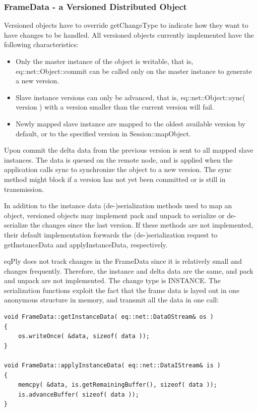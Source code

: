 \documentclass[10pt,a4]{scrartcl}
\begin{document}
\subsubsection{FrameData - a Versioned Distributed Object}

Versioned objects have to override \textsf{getChangeType} to indicate
how they want to have changes to be handled. All versioned objects
currently implemented have the following characteristics:
\begin{itemize}
\item Only the master instance of the object is writable, that is,
  \textsf{eq::net::Object::com\-mit} can be called only on the master
  instance to generate a new version.
\item Slave instance versions can only be advanced, that is,
  \textsf{eq::net::Object::sync( version )} with a version smaller than
  the current version will fail.
\item Newly mapped slave instance are mapped to the oldest available
  version by default, or to the specified version in
  \textsf{Session::mapObject}.
\end{itemize}

Upon \textsf{commit} the delta data from the previous version is sent to
all mapped slave instances. The data is queued on the remote node, and
is applied when the application calls \textsf{sync} to synchronize the
object to a new version. The \textsf{sync} method might block if a
version has not yet been committed or is still in transmission.

In addition to the instance data (de-)serialization methods used to map
an object, versioned objects may implement \textsf{pack} and
\textsf{unpack} to serialize or de-serialize the changes since the last
version. If these methods are not implemented, their default
implementation forwards the (de-)serialization request to
\textsf{getInstanceData} and \textsf{applyInstanceData}, respectively.

\textsf{eqPly} does not track changes in the \textsf{FrameData} since it
is relatively small and changes frequently. Therefore, the instance and
delta data are the same, and \textsf{pack} and \textsf{unpack} are not
implemented. The change type is \textsf{INSTANCE}. The serialization
functions exploit the fact that the frame data is layed out in one
anonymous structure in memory, and transmit all the data in one call:

{\footnotesize\begin{lstlisting}
void FrameData::getInstanceData( eq::net::DataOStream& os )
{ 
    os.writeOnce( &data, sizeof( data )); 
}

void FrameData::applyInstanceData( eq::net::DataIStream& is )
{
    memcpy( &data, is.getRemainingBuffer(), sizeof( data ));
    is.advanceBuffer( sizeof( data ));
}
\end{lstlisting}}%
\end{document}
